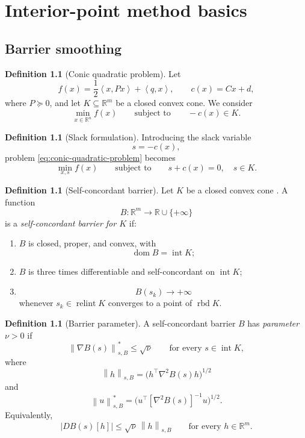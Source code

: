 \documentclass[a4paper,11pt]{book}
\theoremstyle{plain}
\theoremstyle{definition}
\newtheorem{definition}[theorem]{Definition}
\theoremstyle{remark}
\numberwithin{equation}{chapter}
\numberwithin{algorithm}{chapter}
\newcommand{\R}{\mathbb{R}}
\newcommand{\norm}[1]{\left\|#1\right\|}
\newcommand{\inner}[2]{\left\langle #1, #2 \right\rangle}
\newcommand{\dom}{\operatorname{dom}}
\newcommand{\intr}{\operatorname{int}}
\newcommand{\relint}{\operatorname{relint}}
\newcommand{\relbd}{\operatorname{rbd}}
\begin{document}
	\chapter{Interior-point method basics}
	
	\section{Barrier smoothing}
	
	\begin{definition}[Conic quadratic problem]
		Let
		\[
		f(x)=\frac12\inner{x}{Px}+\inner{q}{x},
		\qquad
		c(x)=Cx+d,
		\]
		where \(P\succeq0\), and let \(K\subseteq\R^m\) be a closed convex cone. We
		consider
		\begin{equation}
			\min_{x\in\R^n} f(x)
			\qquad
			\text{subject to}
			\qquad
			-c(x)\in K.
			\label{eq:conic-quadratic-problem}
		\end{equation}
	\end{definition}
	
	\begin{definition}[Slack formulation]
		Introducing the slack variable
		\[
		s=-c(x),
		\]
		problem \eqref{eq:conic-quadratic-problem} becomes
		\begin{equation}
			\min_{x,s} f(x)
			\qquad
			\text{subject to}
			\qquad
			s+c(x)=0,
			\quad
			s\in K.
			\label{eq:slack-formulation}
		\end{equation}
	\end{definition}
	
	
	\begin{definition}[Self-concordant barrier]
		Let \(K\) be a closed convex cone . A function
		\[
		B:\R^m\to\R\cup\{+\infty\}
		\]
		is a \emph{self-concordant barrier for \(K\)} if:
		
		\begin{enumerate}
			\item \(B\) is closed, proper, and convex, with
			\[
			\dom B=\intr K;
			\]
			
			\item \(B\) is three times differentiable and self-concordant on
			\(\intr K\);
			
			\item
			\[
			B(s_k)\longrightarrow+\infty
			\]
			whenever \(s_k\in\relint K\) converges to a point of \(\relbd K\).
		\end{enumerate}
	\end{definition}
	
	\begin{definition}[Barrier parameter]
		A self-concordant barrier \(B\) has \emph{parameter \(\nu>0\)} if
		\begin{equation}
			\norm{\nabla B(s)}_{s,B}^*
			\leq
			\sqrt{\nu}
			\qquad
			\text{for every }s\in\intr K,
			\label{eq:barrier-parameter}
		\end{equation}
		where
		\[
		\norm{h}_{s,B}
		=
		\bigl(
		h^\top\nabla^2B(s)h
		\bigr)^{1/2}
		\]
		and
		\[
		\norm{u}_{s,B}^*
		=
		\bigl(
		u^\top[\nabla^2B(s)]^{-1}u
		\bigr)^{1/2}.
		\]
		Equivalently,
		\[
		|DB(s)[h]|
		\leq
		\sqrt{\nu}\,\norm{h}_{s,B}
		\qquad
		\text{for every }h\in\R^m.
		\]
	\end{definition}
	
\end{document}
